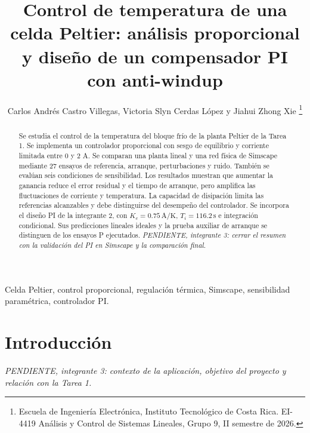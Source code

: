 \documentclass[journal,twocolumn]{IEEEtran}
\begin{document}
\title{Control de temperatura de una celda Peltier: análisis proporcional y diseño de un compensador PI con anti-windup}
\author{Carlos Andrés Castro Villegas, Victoria Slyn Cerdas López y Jiahui Zhong Xie%
\thanks{Escuela de Ingeniería Electrónica, Instituto Tecnológico de Costa Rica. EI-4419 Análisis y Control de Sistemas Lineales, Grupo 9, II semestre de 2026.}}
\maketitle

\begin{abstract}
Se estudia el control de la temperatura del bloque frío de la planta Peltier de la Tarea 1. Se implementa un controlador proporcional con sesgo de equilibrio y corriente limitada entre 0 y 2 A. Se comparan una planta lineal y una red física de Simscape mediante 27 ensayos de referencia, arranque, perturbaciones y ruido. También se evalúan seis condiciones de sensibilidad. Los resultados muestran que aumentar la ganancia reduce el error residual y el tiempo de arranque, pero amplifica las fluctuaciones de corriente y temperatura. La capacidad de disipación limita las referencias alcanzables y debe distinguirse del desempeño del controlador.
Se incorpora el diseño PI de la integrante 2, con $K_c=0.75\,\mathrm{A/K}$, $T_i=116.2\,\mathrm s$ e integración condicional. Sus predicciones lineales ideales y la prueba auxiliar de arranque se distinguen de los ensayos P ejecutados. \textit{PENDIENTE, integrante 3: cerrar el resumen con la validación del PI en Simscape y la comparación final.}
\end{abstract}

\begin{IEEEkeywords}
Celda Peltier, control proporcional, regulación térmica, Simscape, sensibilidad paramétrica, controlador PI.
\end{IEEEkeywords}

\section{Introducción}
\textit{PENDIENTE, integrante 3: contexto de la aplicación, objetivo del proyecto y relación con la Tarea 1.}

\end{document}
